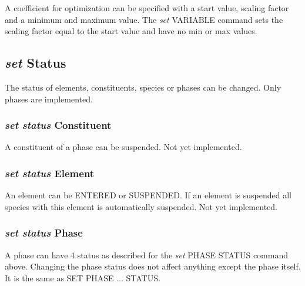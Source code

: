 \documentclass[12pt]{article}
\begin{document}
A coefficient for optimization can be specified with a start value,
scaling factor and a minimum and maximum value.  The {\em set} VARIABLE
command sets the scaling factor equal to the start value and have no
min or max values.

\subsection{{\em set} Status}

The status of elements, constituents, species or phases can be
changed.  Only phases are implemented.

\subsubsection{{\em set status} Constituent}

A constituent of a phase can be suspended.  Not yet implemented.

\subsubsection{{\em set status} Element}

An element can be ENTERED or SUSPENDED.  If an element is suspended
all species with this element is automatically suspended.  Not yet
implemented.

\subsubsection{{\em set status} Phase}

A phase can have 4 status as described for the {\em set} PHASE STATUS
command above.  Changing the phase status does not affect anything
except the phase itself.  It is the same as SET PHASE ... STATUS.
\end{document}
